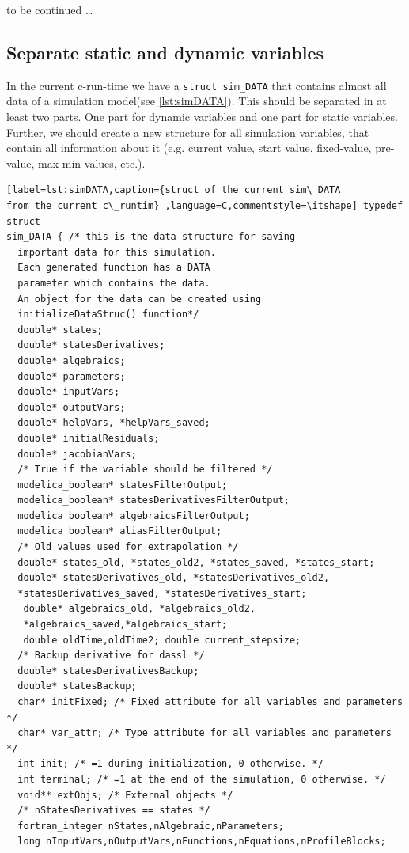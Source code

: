 to be continued \ldots

\subsection{Separate static and dynamic variables}\label{sec:separetdata}

In the current c-run-time we have a \lstinline{struct sim_DATA} that
contains almost all data of a simulation model(see \ref{lst:simDATA}). This
should be separated in at least two parts. One part for dynamic variables and
one part for static variables. Further, we should create a new structure for all
simulation variables, that contain all information about it (e.g. current
value, start value, fixed-value, pre-value, max-min-values, etc.).

\begin{lstlisting}[label=lst:simDATA,caption={struct of the current sim\_DATA
from the current c\_runtim} ,language=C,commentstyle=\itshape] typedef struct
sim_DATA { /* this is the data structure for saving 
  important data for this simulation.
  Each generated function has a DATA 
  parameter which contains the data.
  An object for the data can be created using
  initializeDataStruc() function*/
  double* states;
  double* statesDerivatives;
  double* algebraics;
  double* parameters;
  double* inputVars;
  double* outputVars;
  double* helpVars, *helpVars_saved;
  double* initialResiduals;
  double* jacobianVars;
  /* True if the variable should be filtered */
  modelica_boolean* statesFilterOutput;
  modelica_boolean* statesDerivativesFilterOutput;
  modelica_boolean* algebraicsFilterOutput;
  modelica_boolean* aliasFilterOutput;
  /* Old values used for extrapolation */
  double* states_old, *states_old2, *states_saved, *states_start;
  double* statesDerivatives_old, *statesDerivatives_old2, 
  *statesDerivatives_saved, *statesDerivatives_start;
   double* algebraics_old, *algebraics_old2,
   *algebraics_saved,*algebraics_start;
   double oldTime,oldTime2; double current_stepsize;
  /* Backup derivative for dassl */
  double* statesDerivativesBackup;
  double* statesBackup;
  char* initFixed; /* Fixed attribute for all variables and parameters */
  char* var_attr; /* Type attribute for all variables and parameters */
  int init; /* =1 during initialization, 0 otherwise. */
  int terminal; /* =1 at the end of the simulation, 0 otherwise. */
  void** extObjs; /* External objects */
  /* nStatesDerivatives == states */
  fortran_integer nStates,nAlgebraic,nParameters;
  long nInputVars,nOutputVars,nFunctions,nEquations,nProfileBlocks;

\end{lstlisting}
